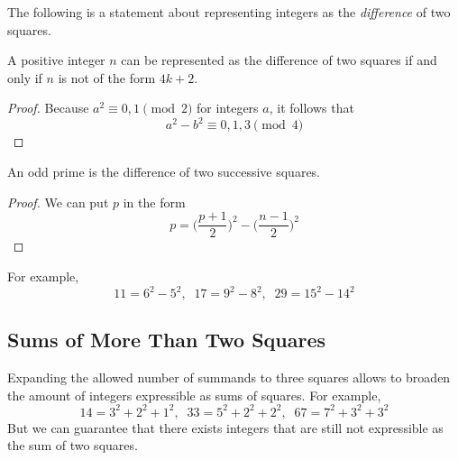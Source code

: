 \documentclass{article}
\newcounter{theorem}[section]
\newcounter{example}[section]
\begin{document}
The following is a statement about representing integers as the \textit{difference} of two squares. 

\begin{theorem}
  \label{thm:representability-as-a-difference-of-two-squares}
A positive integer $n$ can be represented as the difference of two squares if and only if $n$ is not of the form $4k + 2$. 
\end{theorem}
\begin{proof}
Because $a^2 \equiv 0, 1 \pmod{2}$ for integers $a$, it follows that
\begin{equation}
  a^2 - b^2 \equiv 0, 1, 3 \pmod{4}
\end{equation}
\end{proof}

\begin{corollary}
  \label{thm:odd-primes-as-a-difference-of-successive-squares}
An odd prime is the difference of two successive squares. 
\end{corollary}
\begin{proof}
We can put $p$ in the form 
\begin{equation}
  p = \bigg( \frac{p+1}{2} \bigg)^2 - \bigg( \frac{n-1}{2} \bigg)^2
\end{equation}
\end{proof}

For example, 
\begin{equation}
  11 = 6^2 - 5^2, \;\; 17 = 9^2 - 8^2, \;\; 29 = 15^2 - 14^2
\end{equation}

\subsection{Sums of More Than Two Squares}
Expanding the allowed number of summands to three squares allows to broaden the amount of integers expressible as sums of squares. For example, 
\begin{equation}
  14 = 3^2 + 2^2 + 1^2, \;\; 33 = 5^2 + 2^2 + 2^2, \;\; 67 = 7^2 + 3^2 + 3^2
\end{equation}
But we can guarantee that there exists integers that are still not expressible as the sum of two squares. 
\end{document}
